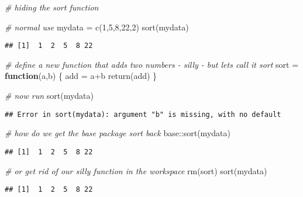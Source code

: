 \documentclass[
  ignorenonframetext,
]{beamer}
\newenvironment{Shaded}{\begin{snugshade}}{\end{snugshade}}
\newcommand{\CommentTok}[1]{\textcolor[rgb]{0.56,0.35,0.01}{\textit{#1}}}
\newcommand{\ControlFlowTok}[1]{\textcolor[rgb]{0.13,0.29,0.53}{\textbf{#1}}}
\newcommand{\DecValTok}[1]{\textcolor[rgb]{0.00,0.00,0.81}{#1}}
\newcommand{\FunctionTok}[1]{\textcolor[rgb]{0.00,0.00,0.00}{#1}}
\newcommand{\NormalTok}[1]{#1}
\newcommand{\OtherTok}[1]{\textcolor[rgb]{0.56,0.35,0.01}{#1}}
\newcommand{\SpecialCharTok}[1]{\textcolor[rgb]{0.00,0.00,0.00}{#1}}
\begin{document}
\begin{frame}[fragile]{}
\protect\hypertarget{section-1}{}
\begin{Shaded}
\begin{Highlighting}[]
\CommentTok{\# hiding the sort function}

\CommentTok{\# normal use}
\NormalTok{mydata }\OtherTok{=} \FunctionTok{c}\NormalTok{(}\DecValTok{1}\NormalTok{,}\DecValTok{5}\NormalTok{,}\DecValTok{8}\NormalTok{,}\DecValTok{22}\NormalTok{,}\DecValTok{2}\NormalTok{)}
\FunctionTok{sort}\NormalTok{(mydata)}
\end{Highlighting}
\end{Shaded}

\begin{verbatim}
## [1]  1  2  5  8 22
\end{verbatim}

\begin{Shaded}
\begin{Highlighting}[]
\CommentTok{\# define a new function that adds two numbers {-} silly {-} but lets call it sort}
\NormalTok{sort }\OtherTok{=} \ControlFlowTok{function}\NormalTok{(a,b) \{}
\NormalTok{  add }\OtherTok{=}\NormalTok{ a}\SpecialCharTok{+}\NormalTok{b}
  \FunctionTok{return}\NormalTok{(add)}
\NormalTok{\}}

\CommentTok{\# now run}
\FunctionTok{sort}\NormalTok{(mydata)}
\end{Highlighting}
\end{Shaded}

\begin{verbatim}
## Error in sort(mydata): argument "b" is missing, with no default
\end{verbatim}

\begin{Shaded}
\begin{Highlighting}[]
\CommentTok{\# how do we get the base package sort back}
\NormalTok{base}\SpecialCharTok{::}\FunctionTok{sort}\NormalTok{(mydata)}
\end{Highlighting}
\end{Shaded}

\begin{verbatim}
## [1]  1  2  5  8 22
\end{verbatim}

\begin{Shaded}
\begin{Highlighting}[]
\CommentTok{\# or get rid of our silly function in the workspace}
\FunctionTok{rm}\NormalTok{(sort)}
\FunctionTok{sort}\NormalTok{(mydata)}
\end{Highlighting}
\end{Shaded}

\begin{verbatim}
## [1]  1  2  5  8 22
\end{verbatim}
\end{frame}
\end{document}
